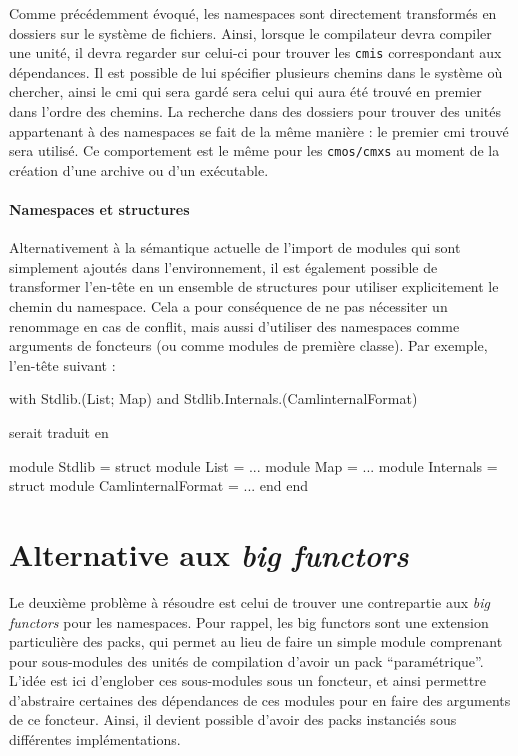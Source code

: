 \documentclass[11pt,a4paper]{report}
\begin{document}
Comme précédemment évoqué, les namespaces sont directement transformés en
dossiers sur le système de fichiers. Ainsi, lorsque le compilateur devra
compiler une unité, il devra regarder sur celui-ci pour trouver les
\texttt{cmis} correspondant aux dépendances. Il est possible de lui spécifier
plusieurs chemins dans le système où chercher, ainsi le cmi qui sera gardé sera
celui qui aura été trouvé en premier dans l'ordre des chemins. La recherche dans
des dossiers pour trouver des unités appartenant à des namespaces se fait de la
même manière : le premier cmi trouvé sera utilisé. Ce comportement est le même
pour les \texttt{cmos/cmxs} au moment de la création d'une archive ou d'un
exécutable.

\paragraph{Namespaces et structures}

Alternativement à la sémantique actuelle de l'import de modules qui sont
simplement ajoutés dans l'environnement, il est également possible de
transformer l'en-tête en un ensemble de structures pour utiliser explicitement le
chemin du namespace. Cela a pour conséquence de ne pas nécessiter un renommage
en cas de conflit, mais aussi d'utiliser des namespaces comme arguments de
foncteurs (ou comme modules de première classe). Par exemple, l'en-tête suivant
:
\begin{OCaml}
with Stdlib.(List; Map)
and Stdlib.Internals.(CamlinternalFormat)
\end{OCaml}
serait traduit en
\begin{OCaml}
module Stdlib =
  struct
    module List = ...
    module Map = ...
    module Internals =
      struct
        module CamlinternalFormat = ...
      end
  end
\end{OCaml}

\section{Alternative aux \emph{big functors}}

Le deuxième problème à résoudre est celui de trouver une contrepartie aux
\emph{big functors} pour les namespaces. Pour rappel, les big functors sont une
extension particulière des packs, qui permet au lieu de faire un simple module
comprenant pour sous-modules des unités de compilation d'avoir un pack
``paramétrique''. L'idée est ici d'englober ces sous-modules sous un foncteur, et
ainsi permettre d'abstraire certaines des dépendances de ces modules pour en
faire des arguments de ce foncteur. Ainsi, il devient possible d'avoir des packs
instanciés sous différentes implémentations.
\end{document}
